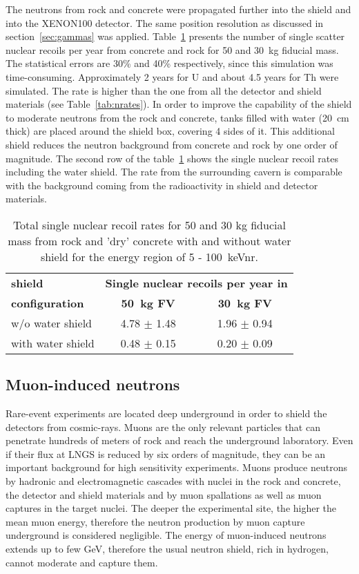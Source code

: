 The neutrons from rock and concrete were propagated further into the shield and
into the XENON100 detector.  
The same position resolution as discussed in section~\ref{sec:gammas} was applied.
Table~\ref{tab:rock-rates} presents the number of single scatter nuclear recoils per year from
concrete and rock for 50 and 30~kg fiducial mass. The statistical 
errors are 30\% and 40\% respectively,
since this simulation was time-consuming. Approximately 2 years for U
and about 4.5 years for Th were simulated. The rate is higher
than the one from all the detector and shield materials (see
Table~\ref{tab:nrates}). In order to improve the capability of the shield to moderate neutrons from the rock and concrete, tanks filled with water (20~cm thick) are placed
around the shield box, covering 4 sides of it. This
additional shield reduces the neutron background from
concrete and rock by one order of magnitude.
The second row of the table~\ref{tab:rock-rates} shows the single
nuclear recoil rates including the water shield. The rate from the 
surrounding cavern is comparable with the
background coming from the radioactivity in shield and detector materials. 

\begin{table}[h]
\centering
\caption{Total single nuclear recoil rates for 50 and 30 kg fiducial mass
from rock and 'dry' concrete \cite{wulandari} with and without water shield for the energy
region of 5 - 100~keVnr.}
\label{tab:rock-rates}
\vspace{0.3cm}
\begin{tabular}{lcc}
\hline
\bf{shield} &  \multicolumn{2}{c}{\bf{Single nuclear recoils per year in}}\\
\bf{configuration} & \bf{50~kg FV}  & \bf{ 30~kg FV} \\

\hline
w/o water shield  &   4.78 $\pm$ 1.48   &  1.96 $\pm$ 0.94  \\
with water shield &  0.48 $\pm$ 0.15   & 0.20 $\pm$ 0.09    \\
\hline
\end{tabular}
\end{table}

\subsection {Muon-induced neutrons} \label{sec:muon-intro}

Rare-event experiments are located deep underground in order to shield the
detectors from cosmic-rays. Muons are the only relevant particles that can penetrate 
hundreds of meters of rock and reach the underground laboratory.
Even if their flux at LNGS is reduced by six orders of magnitude, they can
be an important background for high sensitivity experiments.
Muons produce neutrons by hadronic and
electromagnetic cascades with nuclei in the rock and concrete, the detector and shield
materials and by muon spallations as well as muon captures in the target nuclei.
The deeper the experimental site, the higher the mean muon energy,
therefore the neutron production by muon capture underground is
considered negligible.
The energy of muon-induced neutrons extends up to few GeV, therefore
the usual neutron shield, rich in hydrogen, cannot moderate and capture
them.

